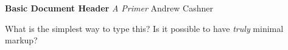 \documentclass{article}
\newenvironment{titleblock}
  {\parindent=0pt\obeylines}
  {\bigskip}
\newcommand{\strong}{\textbf}
\begin{document}
\begin{titleblock}
\strong{Basic Document Header}
\emph{A Primer}
Andrew Cashner
\end{titleblock}

What is the simplest way to type this?
Is it possible to have \emph{truly} minimal markup?
\end{document}
